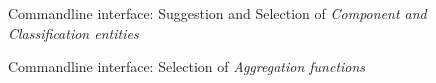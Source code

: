 \begin{figure}[p]
  
  \caption{Commandline interface: Suggestion and Selection of \emph{Component and Classification entities}}
  \label{fig:dimensionalModelSuggestion}
\end{figure}

\begin{figure}[p]
  
  \caption{Commandline interface: Selection of \emph{Aggregation functions}}
  \label{fig:aggregationSelection}
\end{figure}

